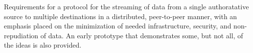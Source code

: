 \documentclass{ubb_dolgozat}
\author{Gardner Márk}
\begin{document}
\begin{abstractEN}
Requirements for a protocol for the streaming of data from a single
authoratative source to multiple destinations in a distributed,
peer-to-peer manner, with an emphasis placed on the minimization of
needed infrastructure, security, and non-repudiation of data. An early prototype that demonstrates some, but not all, of the ideas is also provided.
\end{abstractEN}
\maketitle
\tableofcontents














\end{document}
